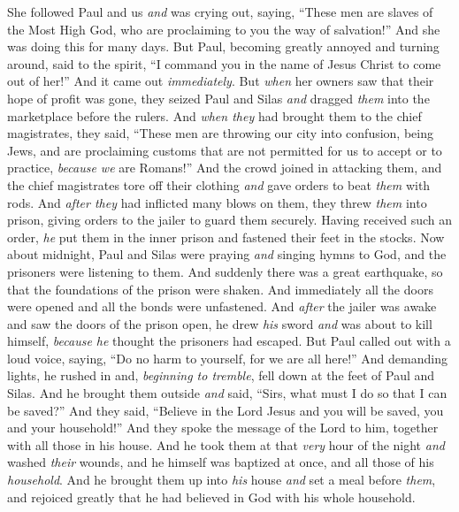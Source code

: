\begin{biblechapter}
\verse She followed Paul and us \textit{and} was crying out, saying, “These men are slaves of the Most High God, who are proclaiming to you the way of salvation!”
\verse And she was doing this for many days. But Paul, becoming greatly annoyed and turning around, said to the spirit, “I command you in the name of Jesus Christ to come out of her!” And it came out \textit{immediately}.
\verse But \textit{when} her owners saw that their hope of profit was gone, they seized Paul and Silas \textit{and} dragged \textit{them} into the marketplace before the rulers.
\verse And \textit{when they} had brought them to the chief magistrates, they said, “These men are throwing our city into confusion, being Jews,
\verse and are proclaiming customs that are not permitted for us to accept or to practice, \textit{because we} are Romans!”
\verse And the crowd joined in attacking them, and the chief magistrates tore off their clothing \textit{and} gave orders to beat \textit{them} with rods.
\verse And \textit{after they} had inflicted many blows on them, they threw \textit{them} into prison, giving orders to the jailer to guard them securely.
\verse Having received such an order, \textit{he} put them in the inner prison and fastened their feet in the stocks.
 Now about midnight, Paul and Silas were praying \textit{and} singing hymns to God, and the prisoners were listening to them.
\verse And suddenly there was a great earthquake, so that the foundations of the prison were shaken. And immediately all the doors were opened and all the bonds were unfastened.
\verse And \textit{after} the jailer was awake and saw the doors of the prison open, he drew \textit{his} sword \textit{and} was about to kill himself, \textit{because he} thought the prisoners had escaped.
\verse But Paul called out with a loud voice, saying, “Do no harm to yourself, for we are all here!”
\verse And demanding lights, he rushed in and, \textit{beginning to tremble}, fell down at the feet of Paul and Silas.
\verse And he brought them outside \textit{and} said, “Sirs, what must I do so that I can be saved?”
\verse And they said, “Believe in the Lord Jesus and you will be saved, you and your household!”
\verse And they spoke the message of the Lord to him, together with all those in his house.
\verse And he took them at that \textit{very} hour of the night \textit{and} washed \textit{their} wounds, and he himself was baptized at once, and all those of his \textit{household}.
\verse And he brought them up into \textit{his} house \textit{and} set a meal before \textit{them}, and rejoiced greatly that he had believed in God with his whole household.

\end{biblechapter}
